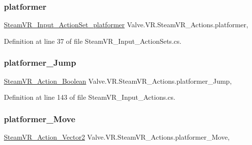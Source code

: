 \subsubsection{\texorpdfstring{platformer}{platformer}}
{\footnotesize\ttfamily \mbox{\hyperlink{class_valve_1_1_v_r_1_1_steam_v_r___input___action_set__platformer}{Steam\+V\+R\+\_\+\+Input\+\_\+\+Action\+Set\+\_\+platformer}} Valve.\+V\+R.\+Steam\+V\+R\+\_\+\+Actions.\+platformer\hspace{0.3cm}{\ttfamily [static]}, {\ttfamily [get]}}



Definition at line 37 of file Steam\+V\+R\+\_\+\+Input\+\_\+\+Action\+Sets.\+cs.

\mbox{\label{class_valve_1_1_v_r_1_1_steam_v_r___actions_a878bba23e9730e5e2601bc3052e3bb4f}} 
\subsubsection{\texorpdfstring{platformer\_Jump}{platformer\_Jump}}
{\footnotesize\ttfamily \mbox{\hyperlink{class_valve_1_1_v_r_1_1_steam_v_r___action___boolean}{Steam\+V\+R\+\_\+\+Action\+\_\+\+Boolean}} Valve.\+V\+R.\+Steam\+V\+R\+\_\+\+Actions.\+platformer\+\_\+\+Jump\hspace{0.3cm}{\ttfamily [static]}, {\ttfamily [get]}}



Definition at line 143 of file Steam\+V\+R\+\_\+\+Input\+\_\+\+Actions.\+cs.

\mbox{\label{class_valve_1_1_v_r_1_1_steam_v_r___actions_a2257c24b61ed3abcc4c8f777eb24f718}} 
\subsubsection{\texorpdfstring{platformer\_Move}{platformer\_Move}}
{\footnotesize\ttfamily \mbox{\hyperlink{class_valve_1_1_v_r_1_1_steam_v_r___action___vector2}{Steam\+V\+R\+\_\+\+Action\+\_\+\+Vector2}} Valve.\+V\+R.\+Steam\+V\+R\+\_\+\+Actions.\+platformer\+\_\+\+Move\hspace{0.3cm}{\ttfamily [static]}, {\ttfamily [get]}}



